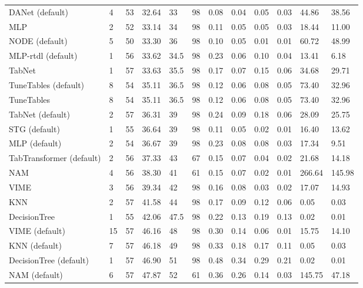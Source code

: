 \begin{tabular}{lllllrllllll}
DANet (default) & 4 & 53 & 32.64 & 33 & 98 & 0.08 & 0.04 & 0.05 & 0.03 & 44.86 & 38.56 \\
MLP & 2 & 52 & 33.14 & 34 & 98 & 0.11 & 0.05 & 0.05 & 0.03 & 18.44 & 11.00 \\
NODE (default) & 5 & 50 & 33.30 & 36 & 98 & 0.10 & 0.05 & 0.01 & 0.01 & 60.72 & 48.99 \\
MLP-rtdl (default) & 1 & 56 & 33.62 & 34.5 & 98 & 0.23 & 0.06 & 0.10 & 0.04 & 13.41 & 6.18 \\
TabNet & 1 & 57 & 33.63 & 35.5 & 98 & 0.17 & 0.07 & 0.15 & 0.06 & 34.68 & 29.71 \\
TuneTables (default) & 8 & 54 & 35.11 & 36.5 & 98 & 0.12 & 0.06 & 0.08 & 0.05 & 73.40 & 32.96 \\
TuneTables & 8 & 54 & 35.11 & 36.5 & 98 & 0.12 & 0.06 & 0.08 & 0.05 & 73.40 & 32.96 \\
TabNet (default) & 2 & 57 & 36.31 & 39 & 98 & 0.24 & 0.09 & 0.18 & 0.06 & 28.09 & 25.75 \\
STG (default) & 1 & 55 & 36.64 & 39 & 98 & 0.11 & 0.05 & 0.02 & 0.01 & 16.40 & 13.62 \\
MLP (default) & 2 & 54 & 36.67 & 39 & 98 & 0.23 & 0.08 & 0.08 & 0.03 & 17.34 & 9.51 \\
TabTransformer (default) & 2 & 56 & 37.33 & 43 & 67 & 0.15 & 0.07 & 0.04 & 0.02 & 21.68 & 14.18 \\
NAM & 4 & 56 & 38.30 & 41 & 61 & 0.15 & 0.07 & 0.02 & 0.01 & 266.64 & 145.98 \\
VIME & 3 & 56 & 39.34 & 42 & 98 & 0.16 & 0.08 & 0.03 & 0.02 & 17.07 & 14.93 \\
KNN & 2 & 57 & 41.58 & 44 & 98 & 0.17 & 0.09 & 0.12 & 0.06 & 0.05 & 0.03 \\
DecisionTree & 1 & 55 & 42.06 & 47.5 & 98 & 0.22 & 0.13 & 0.19 & 0.13 & 0.02 & 0.01 \\
VIME (default) & 15 & 57 & 46.16 & 48 & 98 & 0.30 & 0.14 & 0.06 & 0.01 & 15.75 & 14.10 \\
KNN (default) & 7 & 57 & 46.18 & 49 & 98 & 0.33 & 0.18 & 0.17 & 0.11 & 0.05 & 0.03 \\
DecisionTree (default) & 1 & 57 & 46.90 & 51 & 98 & 0.48 & 0.34 & 0.29 & 0.21 & 0.02 & 0.01 \\
NAM (default) & 6 & 57 & 47.87 & 52 & 61 & 0.36 & 0.26 & 0.14 & 0.03 & 145.75 & 47.18 \\
\bottomrule
\end{tabular}
